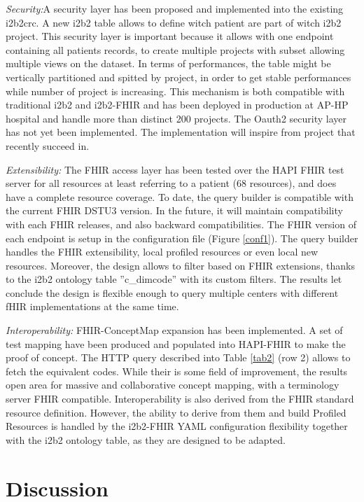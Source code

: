 \documentclass{amia}
\begin{document}
\textit{Security:}A security layer has been proposed and implemented into the existing i2b2crc. A new i2b2 table allows to define witch patient are part of witch i2b2 project. This security layer is important because it allows with one endpoint containing all patients records, to create multiple projects with subset allowing multiple views on the dataset. In terms of performances, the table might be vertically partitioned and spitted by project, in order to get stable performances while number of project is increasing. This mechanism is both compatible with traditional i2b2 and i2b2-FHIR and has been deployed in production at AP-HP hospital and handle more than distinct 200 projects. The Oauth2 security layer has not yet been implemented. The implementation will inspire from project\cite{wag,apple} that recently succeed in.

\textit{Extensibility:} The FHIR access layer has been tested over the HAPI FHIR test server for all resources at least referring to a patient (68 resources), and does have a complete resource coverage. To date, the query builder is compatible with the current FHIR DSTU3 version. In the future, it will maintain compatibility with each FHIR releases, and also backward compatibilities. The FHIR version of each endpoint is setup in the configuration file (Figure \ref{conf1}). The query builder handles the FHIR extensibility, local profiled resources or even local new resources. Moreover, the design allows to filter based on FHIR extensions, thanks to the i2b2 ontology table ''c\_dimcode'' with its custom filters. The results let conclude the design is flexible enough to query multiple centers with different fHIR implementations at the same time.

\textit{Interoperability: }FHIR-ConceptMap expansion has been implemented. A set of test mapping have been produced and populated into HAPI-FHIR to make the proof of concept. The HTTP query described into Table \ref{tab2} (row 2)  allows to fetch the equivalent codes. While their is some field of improvement, the results open area for massive and collaborative concept mapping, with a terminology server FHIR compatible. Interoperability is also derived from the FHIR standard resource definition. However, the ability to derive from them and build Profiled Resources is handled by the i2b2-FHIR YAML configuration flexibility together with the i2b2 ontology table, as they are designed to be adapted.

\section*{Discussion}
\end{document}
